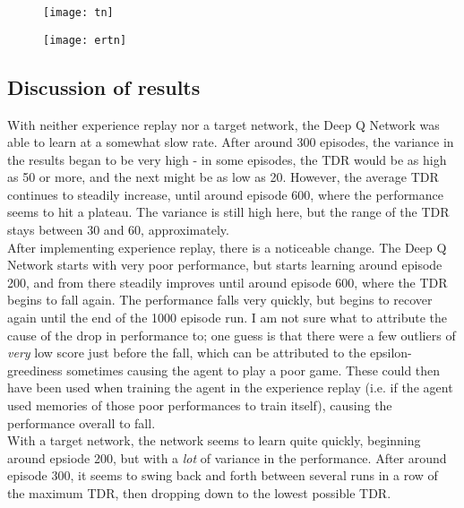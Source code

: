 \documentclass{article}
\begin{document}
  \begin{figure}[!ht]
	  \centering
	    \texttt{[image: tn]}
		\label{fig:tn}
	\end{figure}

  \begin{figure}[!ht]
	  \centering
	    \texttt{[image: ertn]}
		\label{fig:ertn}
	\end{figure}

  \subsection*{Discussion of results}

  With neither experience replay nor a target network, the Deep Q Network was able to learn at a somewhat slow rate.
  After around 300 episodes, the variance in the results began to be very high - in some episodes, the TDR would be as
  high as 50 or more, and the next might be as low as 20. However, the average TDR continues to steadily increase, until
  around episode 600, where the performance seems to hit a plateau. The variance is still high here, but the range of the
  TDR stays between 30 and 60, approximately. \\

  \noindent
  After implementing experience replay, there is a noticeable change. The Deep Q Network starts with very poor performance,
  but starts learning around episode 200, and from there steadily improves until around episode 600, where the TDR begins
  to fall again. The performance falls very quickly, but begins to recover again until the end of the 1000 episode run.
  I am not sure what to attribute the cause of the drop in performance to; one guess is that there were a few outliers of
  \textit{very} low score just before the fall, which can be attributed to the epsilon-greediness sometimes causing the
  agent to play a poor game. These could then have been used when training the agent in the experience replay (i.e.
  if the agent used memories of those poor performances to train itself), causing the performance overall to fall. \\

  \noindent
  With a target network, the network seems to learn quite quickly, beginning around epsiode 200, but with a \textit{lot}
  of variance in the performance. After around episode 300, it seems to swing back and forth between several runs in a
  row of the maximum TDR, then dropping down to the lowest possible TDR. \\
\end{document}
